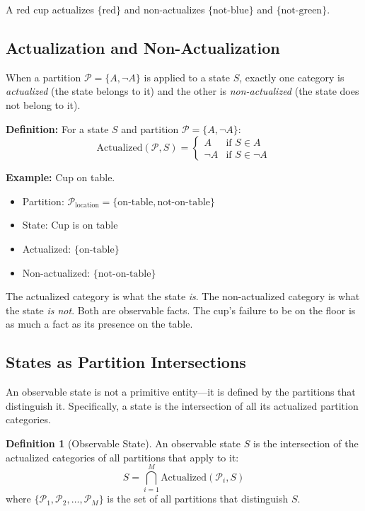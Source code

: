 \documentclass[twocolumn,10pt]{article}
\theoremstyle{definition}
\newtheorem{definition}[theorem]{Definition}
\theoremstyle{remark}
\begin{document}
\noindent A red cup actualizes $\{\text{red}\}$ and non-actualizes $\{\text{not-blue}\}$ and $\{\text{not-green}\}$.

\subsection{Actualization and Non-Actualization}

When a partition $\mathcal{P} = \{A, \neg A\}$ is applied to a state $S$, exactly one category is \textit{actualized} (the state belongs to it) and the other is \textit{non-actualized} (the state does not belong to it).

\vspace{0.2cm}
\noindent\textbf{Definition:} For a state $S$ and partition $\mathcal{P} = \{A, \neg A\}$:
\begin{equation}
\text{Actualized}(\mathcal{P}, S) = 
\begin{cases}
A & \text{if } S \in A \\
\neg A & \text{if } S \in \neg A
\end{cases}
\end{equation}

\noindent\textbf{Example:} Cup on table.
\begin{itemize}
\item Partition: $\mathcal{P}_{\text{location}} = \{\text{on-table}, \text{not-on-table}\}$
\item State: Cup is on table
\item Actualized: $\{\text{on-table}\}$
\item Non-actualized: $\{\text{not-on-table}\}$
\end{itemize}

\noindent The actualized category is what the state \textit{is}. The non-actualized category is what the state \textit{is not}. Both are observable facts. The cup's failure to be on the floor is as much a fact as its presence on the table.

\subsection{States as Partition Intersections}

An observable state is not a primitive entity—it is defined by the partitions that distinguish it. Specifically, a state is the intersection of all its actualized partition categories.

\begin{definition}[Observable State]
\label{def:observable_state}
An observable state $S$ is the intersection of the actualized categories of all partitions that apply to it:
\begin{equation}
S = \bigcap_{i=1}^{M} \text{Actualized}(\mathcal{P}_i, S)
\end{equation}
where $\{\mathcal{P}_1, \mathcal{P}_2, \ldots, \mathcal{P}_M\}$ is the set of all partitions that distinguish $S$.
\end{definition}
\end{document}
